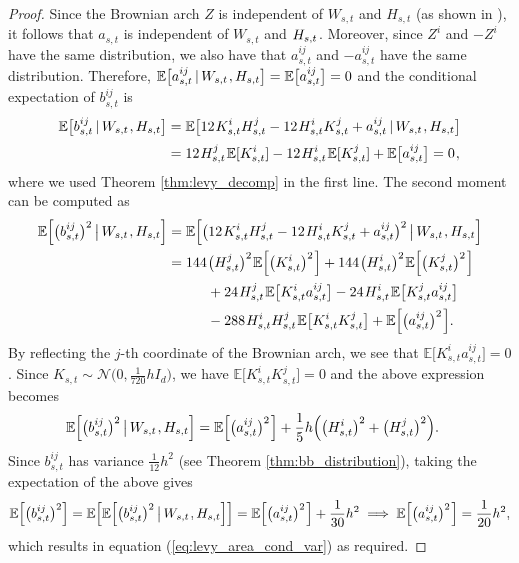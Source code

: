 \documentclass[sn-mathphys-num]{sn-jnl}%
\newcommand{\E}{\mathbb{E}}
\newcommand{\m}{\hspace{0.25mm}}
\newcommand{\mmm}{\hspace{10mm}}
\begin{document}
\begin{proof}
Since the Brownian arch $Z$ is independent of $W_{s,t}$ and $H_{s,t}$ (as shown in \cite{foster2020poly}), it follows that $a_{s,t}$ is independent of $W_{s,t}$ and $H_{s,t}\m$. Moreover, since $Z^i$ and $-Z^i$ have the same distribution, we also have that $a_{s,t}^{ij}$ and $-a_{s,t}^{ij}$ have the same distribution. Therefore, $\E\big[a_{s,t}^{ij}\,|\, W_{s,t}\m, H_{s,t}\big] = \E\big[a_{s,t}^{ij}\big] = 0$ and the conditional expectation of $b_{s,t}^{ij}$ is
\begin{align*}
\E\big[b_{s,t}^{ij}\,|\, W_{s,t}\m, H_{s,t}\big] & = \E\big[12\m K_{s,t}^i H_{s,t}^j - 12\m H_{s,t}^i K_{s,t}^j + a_{s,t}^{ij}\,|\, W_{s,t}\m, H_{s,t}\big]\\[2pt]
& = 12\m H_{s,t}^j\m\E[K_{s,t}^i] - 12\m H_{s,t}^i\m\E[K_{s,t}^j] + \E\big[a_{s,t}^{ij}\big] = 0\m,
\end{align*}
where we used Theorem \ref{thm:levy_decomp} in the first line. The second moment can be computed as
\begin{align*}
\E\Big[\big(b_{s,t}^{ij}\big)^2\,\big|\, W_{s,t}\m, H_{s,t}\Big] & = \E\Big[\big(12\m K_{s,t}^i H_{s,t}^j - 12\m H_{s,t}^i K_{s,t}^j + a_{s,t}^{ij}\big)^2 \,\big|\, W_{s,t}\m, H_{s,t}\Big]\\
& = 144\m\big(H_{s,t}^j\big)^2\m\E\Big[\big(K_{s,t}^i\big)^2\m\Big] + 144\m\big(H_{s,t}^i\big)^2\m\E\Big[\big(K_{s,t}^j\big)^2\m\Big]\\[1pt]
&\mmm + 24\m H_{s,t}^j\m\E\big[K_{s,t}^i a_{s,t}^{ij}\big] - 24\m H_{s,t}^i\m\E\big[K_{s,t}^j a_{s,t}^{ij}\big]\\[1pt]
&\mmm - 288\m H_{s,t}^i H_{s,t}^j\m\E\big[K_{s,t}^i K_{s,t}^j\big] + \E\Big[\big(a_{s,t}^{ij}\big)^2\m\Big].
\end{align*}
By reflecting the $j$-th coordinate of the Brownian arch, we see that $\E\big[K_{s,t}^i a_{s,t}^{ij}\big] = 0$. Since $K_{s,t}\sim\mathcal{N}\big(0, \frac{1}{720}h I_d\big)$, we have $\E\big[K_{s,t}^i K_{s,t}^j\big] = 0$ and the above expression becomes
\begin{align*}
\E\Big[\big(b_{s,t}^{ij}\big)^2\,\big|\, W_{s,t}\m, H_{s,t}\Big] & = \E\Big[\big(a_{s,t}^{ij}\big)^2\m\Big] + \frac{1}{5}h\Big(\big(H_{s,t}^i\big)^2 + \big(H_{s,t}^j\big)^2\Big).
\end{align*}
Since $b_{s,t}^{ij}$ has variance $\frac{1}{12}h^2$ (see Theorem \ref{thm:bb_distribution}), taking the expectation of the above gives
\begin{align*}
\E\Big[\big(b_{s,t}^{ij}\big)^2\Big] = \E\Big[\E\Big[\big(b_{s,t}^{ij}\big)^2\,\big|\, W_{s,t}\m, H_{s,t}\Big]\Big] = \E\Big[\big(a_{s,t}^{ij}\big)^2\m\Big] + \frac{1}{30}h^2 \implies \E\Big[\big(a_{s,t}^{ij}\big)^2\m\Big] = \frac{1}{20}h^2,
\end{align*}
which results in equation (\ref{eq:levy_area_cond_var}) as required.


\end{proof}
\end{document}
